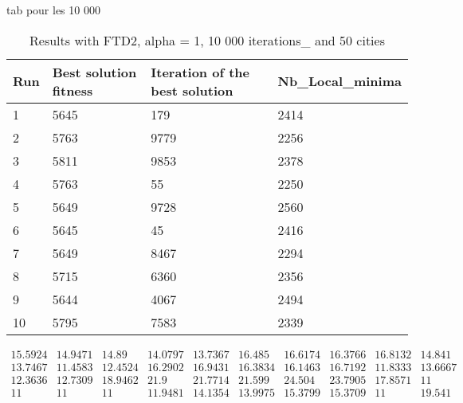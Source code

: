 \documentclass[12pt,oneside,a4paper]{article}
\begin{document}
tab pour les 10 000
\begin{table}[h]
  \centering
  \small
  \begin{tabular}{llll}
    \hline
    \multicolumn{1}{|l|}{\textbf{Run}}& \multicolumn{1}{l|}{\textbf{Best solution fitness}}& \multicolumn{1}{l|}{\textbf{Iteration of the best solution}}& \multicolumn{1}{l|}{\textbf{Nb\_Local\_minima}}\\ \hline
    \multicolumn{1}{|l|}{1} & \multicolumn{1}{l|}{5645}  & \multicolumn{1}{l|}{179} & \multicolumn{1}{l|}{2414}  \\ \hline
    \multicolumn{1}{|l|}{2} & \multicolumn{1}{l|}{5763}  & \multicolumn{1}{l|}{9779} & \multicolumn{1}{l|}{2256}  \\ \hline
    \multicolumn{1}{|l|}{3} & \multicolumn{1}{l|}{5811}  & \multicolumn{1}{l|}{9853}  & \multicolumn{1}{l|}{2378}  \\ \hline
    \multicolumn{1}{|l|}{4} & \multicolumn{1}{l|}{5763}  & \multicolumn{1}{l|}{55}  & \multicolumn{1}{l|}{2250}  \\ \hline
    \multicolumn{1}{|l|}{5} & \multicolumn{1}{l|}{5649}  & \multicolumn{1}{l|}{9728}  & \multicolumn{1}{l|}{2560}  \\ \hline
    \multicolumn{1}{|l|}{6} & \multicolumn{1}{l|}{5645}  & \multicolumn{1}{l|}{45}  & \multicolumn{1}{l|}{2416}  \\ \hline
    \multicolumn{1}{|l|}{7} & \multicolumn{1}{l|}{5649}  & \multicolumn{1}{l|}{8467}  & \multicolumn{1}{l|}{2294}  \\ \hline
    \multicolumn{1}{|l|}{8} & \multicolumn{1}{l|}{5715}  & \multicolumn{1}{l|}{6360} & \multicolumn{1}{l|}{2356}  \\ \hline
    \multicolumn{1}{|l|}{9} & \multicolumn{1}{l|}{5644}  & \multicolumn{1}{l|}{4067} & \multicolumn{1}{l|}{2494}  \\ \hline
    \multicolumn{1}{|l|}{10} & \multicolumn{1}{l|}{5795}  & \multicolumn{1}{l|}{7583} & \multicolumn{1}{l|}{2339}  \\ \hline
  \end{tabular}
  \caption{Results with FTD2, alpha = 1, 10 000 iterations\_ and 50 cities}
\end{table}

\begin{equation}
  \tag{Mean Tabu Duration for each city (alpha = 1 and 50 cities)}
  \begin{smallmatrix} 
15.5924 & 14.9471 & 14.89 & 14.0797 & 13.7367 & 16.485 & 16.6174 & 16.3766 & 16.8132 & 14.841 \\
13.7467 & 11.4583  & 12.4524 & 16.2902 & 16.9431 & 16.3834 & 16.1463 & 16.7192 & 11.8333 & 13.6667 \\
12.3636 & 12.7309&  18.9462 & 21.9&  21.7714 & 21.599 & 24.504 & 23.7905 & 17.8571 & 11 \\
11 & 11 & 11 & 11.9481 & 14.1354 & 13.9975 & 15.3799 & 15.3709 & 11 & 19.541
  \end{smallmatrix}
\end{equation}
\end{document}

